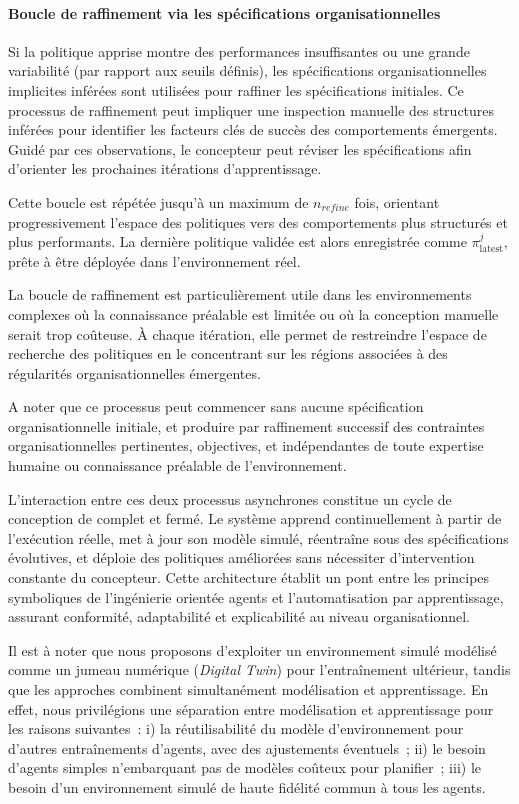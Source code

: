 \paragraph{Boucle de raffinement via les spécifications organisationnelles}

Si la politique apprise montre des performances insuffisantes ou une grande variabilité (par rapport aux seuils définis), les spécifications organisationnelles implicites inférées sont utilisées pour raffiner les spécifications initiales. Ce processus de raffinement peut impliquer une inspection manuelle des structures inférées pour identifier les facteurs clés de succès des comportements émergents. Guidé par ces observations, le concepteur peut réviser les spécifications afin d'orienter les prochaines itérations d'apprentissage.

Cette boucle est répétée jusqu'à un maximum de $n_{refine}$ fois, orientant progressivement l'espace des politiques vers des comportements plus structurés et plus performants. La dernière politique validée est alors enregistrée comme $\pi^j_{\text{latest}}$, prête à être déployée dans l'environnement réel.

La boucle de raffinement est particulièrement utile dans les environnements complexes où la connaissance préalable est limitée ou où la conception manuelle serait trop coûteuse. À chaque itération, elle permet de restreindre l'espace de recherche des politiques en le concentrant sur les régions associées à des régularités organisationnelles émergentes.

A noter que ce processus peut commencer sans aucune spécification organisationnelle initiale, et produire par raffinement successif des contraintes organisationnelles pertinentes, objectives, et indépendantes de toute expertise humaine ou connaissance préalable de l'environnement.

\noindent L'interaction entre ces deux processus asynchrones constitue un cycle de conception de  complet et fermé. Le système apprend continuellement à partir de l'exécution réelle, met à jour son modèle simulé, réentraîne sous des spécifications évolutives, et déploie des politiques améliorées sans nécessiter d'intervention constante du concepteur. Cette architecture établit un pont entre les principes symboliques de l'ingénierie orientée agents et l'automatisation par apprentissage, assurant conformité, adaptabilité et explicabilité au niveau organisationnel.

\noindent Il est à noter que nous proposons d'exploiter un environnement simulé modélisé comme un jumeau numérique (\textit{Digital Twin}) pour l'entraînement ultérieur, tandis que les approches  combinent simultanément modélisation et apprentissage. En effet, nous privilégions une séparation entre modélisation et apprentissage pour les raisons suivantes~: i) la réutilisabilité du modèle d'environnement pour d'autres entraînements d'agents, avec des ajustements éventuels~; \quad ii) le besoin d'agents simples n'embarquant pas de modèles coûteux pour planifier~; \quad iii) le besoin d'un environnement simulé de haute fidélité commun à tous les agents.

